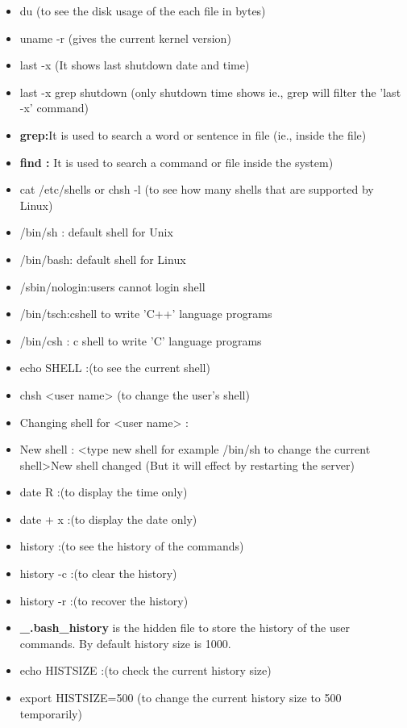 \begin{enumerate}
\begin{itemize}
        \item du (to see the disk usage of the each file in bytes)
        \item uname     -r (gives the current kernel version)
        \item last    -x (It shows last shutdown date and time)
        \item last    -x  grep  shutdown	  (only shutdown time shows ie., grep will filter the  'last   -x'   command)
        \item \textbf{grep:}It is used to search a word or sentence in file (ie., inside the file)
        \item \textbf{find :} It is used to search a command or file inside the system)
        \item cat  /etc/shells   or  chsh   -l  	(to see how many shells that are supported by Linux)
        \item /bin/sh : default shell for Unix
        \item /bin/bash: default shell for Linux
        \item /sbin/nologin:users cannot login shell
        \item /bin/tsch:cshell to write  'C++'  language programs
        \item /bin/csh : c shell to write  'C'  language programs
        \item echo   SHELL :(to see the current shell)
        \item chsh    <user name>	(to change the user's  shell)
        \item Changing shell for   <user name> :
        \item New shell  :   <type new shell   for example  /bin/sh   to change the current shell>New shell changed (But it will effect by restarting the server)
        \item date R :(to display the time only)
        \item date  +  x :(to display the date only)
        \item history :(to see the history of the commands)
        \item history -c :(to clear the history)
        \item  history -r :(to recover the history)
        \item \textbf{\_.bash\_history}  is the hidden file to store the history of the user commands. By default history size is 1000.
        \item echo  HISTSIZE :(to check the current history size)
        \item export   HISTSIZE=500	(to change the current history size to 500 temporarily)

\end{itemize}
\end{enumerate}
